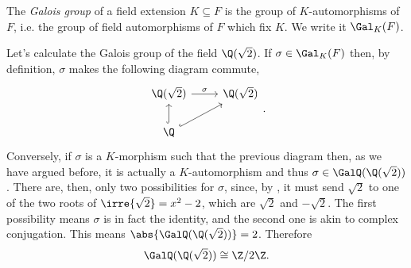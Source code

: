 \documentclass[12pt,oneside]{book}
\begin{document}
\begin{definition}
	The \emph{Galois group} of a field extension \( K \subseteq F \) is the group of \( K
	\)-automorphisms of \( F \), i.e. the group of field automorphisms of \( F \) which fix
\( K \). We write it \( \Gal_K(F) \).
\end{definition}

\begin{example}
	Let's calculate the Galois group of the field \( \Q(\sqrt{2}) \). If \( \sigma
	\in \Gal_K(F) \) then, by definition, \( \sigma \) makes the following diagram commute,
	\begin{equation*}
		\begin{tikzcd}
			\Q(\sqrt{2}) \arrow[r, "\sigma"] & \Q(\sqrt{2}) \\
			\Q \arrow[u, hook] \arrow[ur, hook] &
		\end{tikzcd}.
	\end{equation*}
	Conversely, if \( \sigma \) is a \( K \)-morphism such that the previous diagram then,
	as we have argued before, it is actually a \( K \)-automorphism and thus \( \sigma \in
	\GalQ(\Q(\sqrt{2})) \). There are, then, only two possibilities for \( \sigma \), since, by
	, it must send \( \sqrt{2} \) to one of the two
	roots of \( \irre{\sqrt{2}} = x^2 - 2 \), which are \( \sqrt{2} \) and \( -\sqrt{2} \).
	The first possibility means \( \sigma \) is in fact the identity, and the second one is
	akin to complex conjugation. This means \( \abs{\GalQ(\Q(\sqrt{2}))} = 2 \). Therefore
	\begin{equation*}
		\GalQ(\Q(\sqrt{2})) \cong \Z/2\Z.
	\end{equation*}
\end{example}
\end{document}
